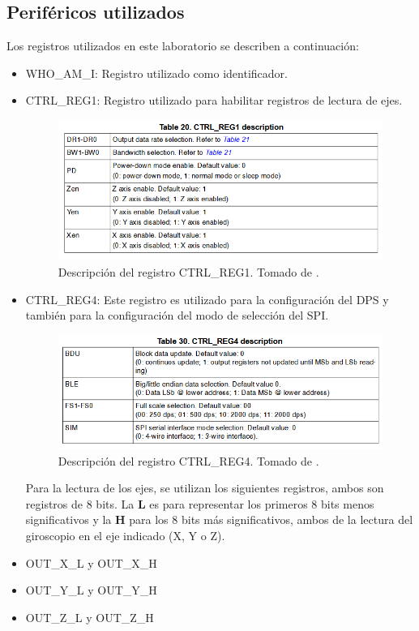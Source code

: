 \subsection*{Periféricos utilizados}
Los registros utilizados en este laboratorio se describen a continuación:
\begin{itemize}
    \item WHO\_AM\_I: Registro utilizado como identificador.
    \item CTRL\_REG1: Registro utilizado para habilitar registros de lectura de ejes.
    \begin{figure}[H]
        \centering
        \includegraphics[width=.7\linewidth]{Imagenes/k1.png}
        \caption{Descripción del registro CTRL\_REG1. Tomado de \cite{l3gd20}.}
        \label{fig5}
    \end{figure}
    \item CTRL\_REG4: Este registro es utilizado para la configuración del DPS y también para la configuración del modo de selección del SPI.
    \begin{figure}[H]
        \centering
        \includegraphics[width=.7\linewidth]{Imagenes/k2.png}
        \caption{Descripción del registro CTRL\_REG4. Tomado de \cite{l3gd20}.}
        \label{fig6}
    \end{figure}
    Para la lectura de los ejes, se utilizan los siguientes registros, ambos son registros de 8 bits. La \textbf{L} es para representar los primeros 8 bits menos significativos y la \textbf{H} para los 8 bits más significativos, ambos de la lectura del giroscopio en el eje indicado (X, Y o Z).
    \item OUT\_X\_L y OUT\_X\_H
    \item OUT\_Y\_L y OUT\_Y\_H
    \item OUT\_Z\_L y OUT\_Z\_H

\end{itemize}

